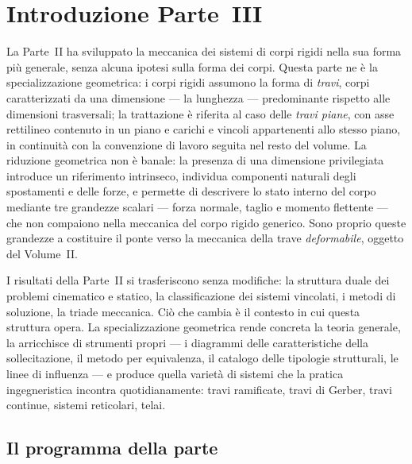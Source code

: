 
\chapter*{Introduzione Parte~III}

La Parte~II ha sviluppato la meccanica dei sistemi di corpi rigidi nella sua forma più
generale, senza alcuna ipotesi sulla forma dei corpi. Questa parte ne è la
specializzazione geometrica: i corpi rigidi assumono la forma di \emph{travi}, corpi
caratterizzati da una dimensione --- la lunghezza --- predominante rispetto alle
dimensioni trasversali; la trattazione è riferita al caso delle \emph{travi piane},
con asse rettilineo contenuto in un piano e carichi e vincoli appartenenti allo stesso
piano, in continuità con la convenzione di lavoro seguita nel resto del volume.
La riduzione geometrica non è banale: la presenza di una dimensione privilegiata
introduce un riferimento intrinseco, individua componenti naturali degli spostamenti e
delle forze, e permette di descrivere lo stato interno del corpo mediante tre grandezze
scalari --- forza normale, taglio e momento flettente --- che non compaiono nella
meccanica del corpo rigido generico. Sono proprio queste grandezze a costituire il
ponte verso la meccanica della trave \emph{deformabile}, oggetto del Volume~II.

I risultati della Parte~II si trasferiscono senza modifiche: la struttura duale dei
problemi cinematico e statico, la classificazione dei sistemi vincolati, i metodi di
soluzione, la triade meccanica. Ciò che cambia è il contesto in cui questa struttura
opera. La specializzazione geometrica rende concreta la teoria generale, la arricchisce
di strumenti propri --- i diagrammi delle caratteristiche della sollecitazione, il
metodo per equivalenza, il catalogo delle tipologie strutturali, le linee di
influenza --- e produce quella varietà di sistemi che la pratica ingegneristica
incontra quotidianamente: travi ramificate, travi di Gerber, travi continue,
sistemi reticolari, telai.

\section*{Il programma della parte}

